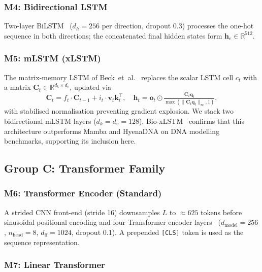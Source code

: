 \subsubsection{M4: Bidirectional LSTM}

Two-layer BiLSTM~\cite{lstm} ($d_h = 256$ per direction, dropout 0.3) processes the
one-hot sequence in both directions; the concatenated final hidden states form
$\mathbf{h}_e \in \mathbb{R}^{512}$.

\subsubsection{M5: mLSTM (xLSTM)}

The matrix-memory LSTM of Beck~et~al.~\cite{xlstm} replaces the scalar LSTM cell
$c_t$ with a matrix $\mathbf{C}_t \in \mathbb{R}^{d_k \times d_v}$, updated via
\begin{equation}
  \mathbf{C}_t = f_t \cdot \mathbf{C}_{t-1} + i_t \cdot \mathbf{v}_t \mathbf{k}_t^\top,\quad
  \mathbf{h}_t = \mathbf{o}_t \odot \tfrac{\mathbf{C}_t \mathbf{q}_t}
    {\max(\|\mathbf{C}_t \mathbf{q}_t\|_\infty, 1)},
\end{equation}
with stabilised normalisation preventing gradient explosion.
We stack two bidirectional mLSTM layers ($d_k = d_v = 128$).
Bio-xLSTM~\cite{bioxlstm} confirms that this architecture outperforms Mamba and
HyenaDNA on DNA modelling benchmarks, supporting its inclusion here.

\subsection{Group C: Transformer Family}

\subsubsection{M6: Transformer Encoder (Standard)}

A strided CNN front-end (stride 16) downsamples $L$ to $\approx 625$ tokens before
sinusoidal positional encoding and four Transformer encoder
layers~\cite{attention_all_you_need}
($d_{\mathrm{model}} = 256$, $n_{\mathrm{head}} = 8$, $d_{\mathrm{ff}} = 1024$,
dropout 0.1).
A prepended \texttt{[CLS]} token is used as the sequence representation.

\subsubsection{M7: Linear Transformer}

